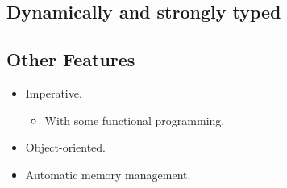 \documentclass[aspectratio=1610,slidestop]{beamer}
\begin{document}
\subsection{Dynamically and strongly typed}
\begin{pframe}
 \begin{center}
   
 \end{center}
\end{pframe}

\subsection{Other Features}
\begin{pframe}
 \begin{itemize}
  \item Imperative.
  \begin{itemize}
   \item With some functional programming.
  \end{itemize}
  \item Object-oriented.
  \item Automatic memory management.
 \end{itemize}
\end{pframe}
\end{document}
